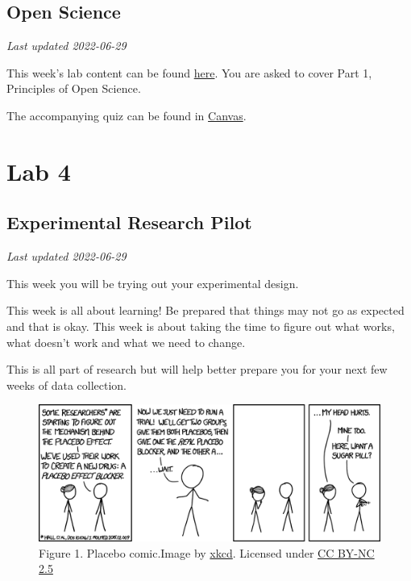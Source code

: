 \documentclass[
]{book}
\begin{document}
\hypertarget{open-science-1}{%
\chapter*{Open Science}\label{open-science-1}}

\emph{Last updated 2022-06-29}

This week's lab content can be found \href{https://ubco-biology.github.io/OS-Introduction/}{here}. You are asked to cover Part 1, Principles of Open Science.

The accompanying quiz can be found in \href{https://canvas.ubc.ca}{Canvas}.

\hypertarget{part-lab-4}{%
\part*{Lab 4}\label{part-lab-4}}

\hypertarget{experimental-research-pilot}{%
\chapter*{Experimental Research Pilot}\label{experimental-research-pilot}}

\emph{Last updated 2022-06-29}

This week you will be trying out your experimental design.

This week is all about learning! Be prepared that things may not go as expected and that is okay. This week is about taking the time to figure out what works, what doesn't work and what we need to change.

This is all part of research but will help better prepare you for your next few weeks of data collection.

\begin{figure}
\centering
\includegraphics{figures_images/Lab4-Fig1.png}
\caption{Figure 1. Placebo comic.Image by \href{https://xkcd.com/1526/}{xkcd}. Licensed under \href{https://creativecommons.org/licenses/by-nc/2.5/}{CC BY-NC 2.5}}
\end{figure}
\end{document}
